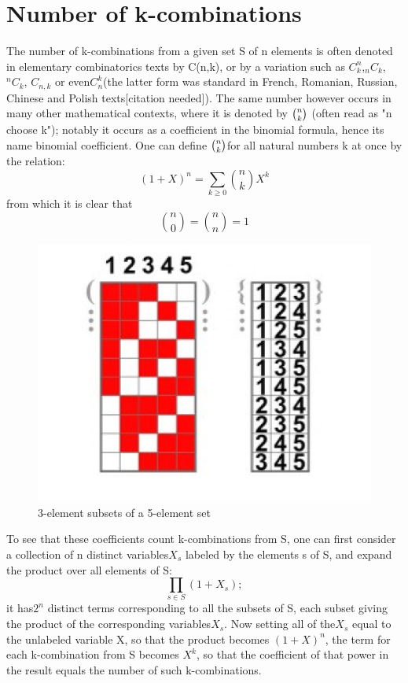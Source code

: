 \documentclass[12pt]{article}
\begin{document}
\section{Number of k-combinations}
The number of k-combinations from a given set S of n elements is often denoted in elementary combinatorics texts by C(n,k), or by a variation such as $C_{k}^{n}$,$ {}_{n}C_{k}$,${}^{n}C_{k}$, $C_{{n,k}}$ or even$ C_{n}^{k} $(the latter form was standard in French, Romanian, Russian, Chinese and Polish texts[citation needed]). The same number however occurs in many other mathematical contexts, where it is denoted by ${\tbinom {n}{k}}$ (often read as "n choose k"); notably it occurs as a coefficient in the binomial formula, hence its name binomial coefficient. One can define ${\tbinom {n}{k}} $for all natural numbers k at once by the relation:
$$(1+X)^n=\sum_{k\ge 0}{{\binom {n}{k}}X^k}$$
from which it is clear that
$${\binom {n}{0}}={\binom {n}{n}}=1$$
\begin{figure}[h]
 \begin{center} \vspace{-5pt}
\includegraphics[scale=0.3]{1.pdf}
\caption{3-element subsets of a 5-element set} \vspace{-10pt} 
\end{center}
\end{figure}
To see that these coefficients count k-combinations from S, one can first consider a collection of n distinct variables$ X_s$ labeled by the elements s of S, and expand the product over all elements of S:
$$\prod_{s\in S}{(1+X_s);}$$
it has$ 2^n$ distinct terms corresponding to all the subsets of S, each subset giving the product of the corresponding variables$ X_s$. Now setting all of the$ X_s$ equal to the unlabeled variable X, so that the product becomes $(1 + X)^n$, the term for each k-combination from S becomes $X^k$, so that the coefficient of that power in the result equals the number of such k-combinations.\\
\end{document}

